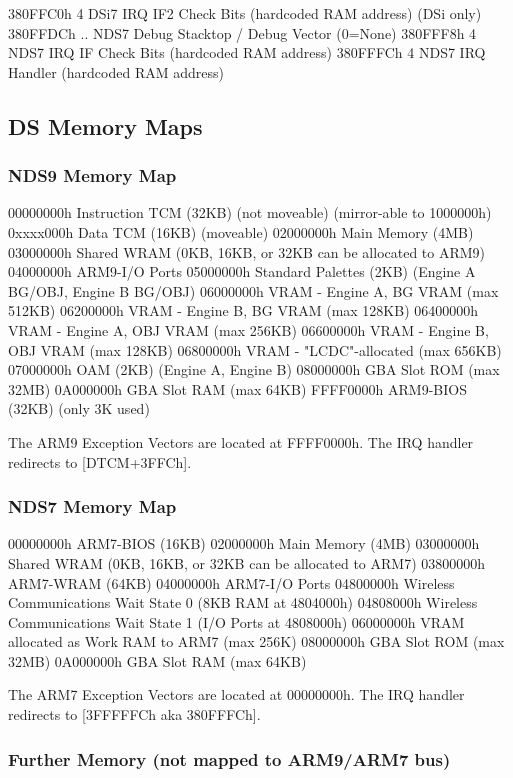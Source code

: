\documentclass[11pt,a4paper]{proc}
\begin{document}
\begin{flushleft}
  380FFC0h  4   DSi7 IRQ IF2 Check Bits (hardcoded RAM address) (DSi only)
  380FFDCh  ..  NDS7 Debug Stacktop / Debug Vector (0=None)
  380FFF8h  4   NDS7 IRQ IF Check Bits (hardcoded RAM address)
  380FFFCh  4   NDS7 IRQ Handler (hardcoded RAM address)

\subsection{DS Memory Maps}
\subsubsection{NDS9 Memory Map}

  00000000h  Instruction TCM (32KB) (not moveable) (mirror-able to 1000000h)
  0xxxx000h  Data TCM        (16KB) (moveable)
  02000000h  Main Memory     (4MB)
  03000000h  Shared WRAM     (0KB, 16KB, or 32KB can be allocated to ARM9)
  04000000h  ARM9-I/O Ports
  05000000h  Standard Palettes (2KB) (Engine A BG/OBJ, Engine B BG/OBJ)
  06000000h  VRAM - Engine A, BG VRAM  (max 512KB)
  06200000h  VRAM - Engine B, BG VRAM  (max 128KB)
  06400000h  VRAM - Engine A, OBJ VRAM (max 256KB)
  06600000h  VRAM - Engine B, OBJ VRAM (max 128KB)
  06800000h  VRAM - "LCDC"-allocated (max 656KB)
  07000000h  OAM (2KB) (Engine A, Engine B)
  08000000h  GBA Slot ROM (max 32MB)
  0A000000h  GBA Slot RAM (max 64KB)
  FFFF0000h  ARM9-BIOS (32KB) (only 3K used)

The ARM9 Exception Vectors are located at FFFF0000h. The IRQ handler redirects to [DTCM+3FFCh].

\subsubsection{NDS7 Memory Map}

  00000000h  ARM7-BIOS (16KB)
  02000000h  Main Memory (4MB)
  03000000h  Shared WRAM (0KB, 16KB, or 32KB can be allocated to ARM7)
  03800000h  ARM7-WRAM (64KB)
  04000000h  ARM7-I/O Ports
  04800000h  Wireless Communications Wait State 0 (8KB RAM at 4804000h)
  04808000h  Wireless Communications Wait State 1 (I/O Ports at 4808000h)
  06000000h  VRAM allocated as Work RAM to ARM7 (max 256K)
  08000000h  GBA Slot ROM (max 32MB)
  0A000000h  GBA Slot RAM (max 64KB)

The ARM7 Exception Vectors are located at 00000000h. The IRQ handler redirects to [3FFFFFCh aka 380FFFCh].

\subsubsection{Further Memory (not mapped to ARM9/ARM7 bus)}


\end{flushleft}
\end{document}
